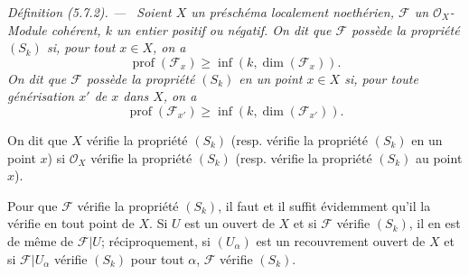\documentclass[10pt,oneside]{book}
\newenvironment{definition}[1][]{%
  \par\medskip\noindent\itshape Définition (#1). ---\ }{\par}
\begin{document}
\begin{definition}[5.7.2]
\label{IV.2.s5.7.2-fr}
Soient $X$ un préschéma localement noethérien, $\mathscr F$ un
$\mathcal O_X$-Module cohérent, $k$ un entier positif ou négatif. On dit que
$\mathscr F$ possède la propriété $(S_k)$ si, pour tout $x\in X$, on a
\begin{equation}
\operatorname{prof}(\mathscr F_x)\geq
\inf(k,\dim(\mathscr F_x)).
\tag{5.7.2.1}\label{IV.2.s5.7.2.1-fr}
\end{equation}
On dit que $\mathscr F$ possède la propriété $(S_k)$ en un point $x\in X$
si, pour toute générisation $x'$ de $x$ dans $X$, on a
\begin{equation}
\operatorname{prof}(\mathscr F_{x'})\geq
\inf(k,\dim(\mathscr F_{x'})).
\tag{5.7.2.2}\label{IV.2.s5.7.2.2-fr}
\end{equation}

On dit que $X$ vérifie la propriété $(S_k)$ (resp. vérifie la propriété
$(S_k)$ en un point $x$) si $\mathcal O_X$ vérifie la propriété $(S_k)$
(resp. vérifie la propriété $(S_k)$ au point $x$).

Pour que $\mathscr F$ vérifie la propriété $(S_k)$, il faut et il suffit
évidemment qu'il la vérifie en tout point de $X$. Si $U$ est un ouvert de
$X$ et si $\mathscr F$ vérifie $(S_k)$, il en est de même de
$\mathscr F|U$; réciproquement, si $(U_\alpha)$ est un recouvrement ouvert
de $X$ et si $\mathscr F|U_\alpha$ vérifie $(S_k)$ pour tout $\alpha$,
$\mathscr F$ vérifie $(S_k)$.
\end{definition}
\end{document}

